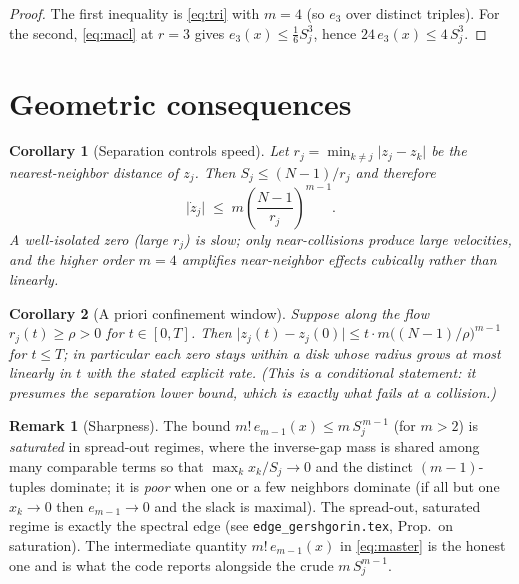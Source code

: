 \documentclass[11pt]{article}
\theoremstyle{plain}
\newtheorem{corollary}{Corollary}
\theoremstyle{definition}
\newtheorem{remark}{Remark}
\newcommand{\abs}[1]{\lvert #1\rvert}
\begin{document}
\begin{proof}
The first inequality is \eqref{eq:tri} with $m=4$ (so $e_3$ over distinct
triples). For the second, \eqref{eq:macl} at $r=3$ gives
$e_3(x)\le \tfrac{1}{6}S_j^3$, hence $24\,e_3(x)\le 4\,S_j^3$.
\end{proof}

\section{Geometric consequences}

\begin{corollary}[Separation controls speed]\label{cor:sep}
Let $r_j=\min_{k\neq j}\abs{z_j-z_k}$ be the nearest-neighbor distance of $z_j$.
Then $S_j\le (N-1)/r_j$ and therefore
\[
  \abs{\dot z_j}\;\le\;m\left(\frac{N-1}{r_j}\right)^{m-1}.
\]
A well-isolated zero (large $r_j$) is slow; only near-collisions produce large
velocities, and the higher order $m=4$ amplifies near-neighbor effects
cubically rather than linearly.
\end{corollary}

\begin{corollary}[A priori confinement window]\label{cor:window}
Suppose along the flow $r_j(t)\ge\rho>0$ for $t\in[0,T]$. Then
$\abs{z_j(t)-z_j(0)}\le t\cdot m\bigl((N-1)/\rho\bigr)^{m-1}$ for $t\le T$;
in particular each zero stays within a disk whose radius grows at most linearly
in $t$ with the stated explicit rate. (This is a conditional statement: it
presumes the separation lower bound, which is exactly what fails at a
collision.)
\end{corollary}

\begin{remark}[Sharpness]
The bound $m!\,e_{m-1}(x)\le m\,S_j^{\,m-1}$ (for $m>2$) is \emph{saturated} in
spread-out regimes, where the inverse-gap mass is shared among many comparable
terms so that $\max_k x_k/S_j\to0$ and the distinct $(m-1)$-tuples dominate; it is
\emph{poor} when one or a few neighbors dominate (if all but one $x_k\to0$ then
$e_{m-1}\to0$ and the slack is maximal). The spread-out, saturated regime is
exactly the spectral edge (see \texttt{edge\_gershgorin.tex},
Prop.\ on saturation). The intermediate quantity $m!\,e_{m-1}(x)$ in
\eqref{eq:master} is the honest one and is what the code reports alongside the
crude $m\,S_j^{m-1}$.
\end{remark}
\end{document}
